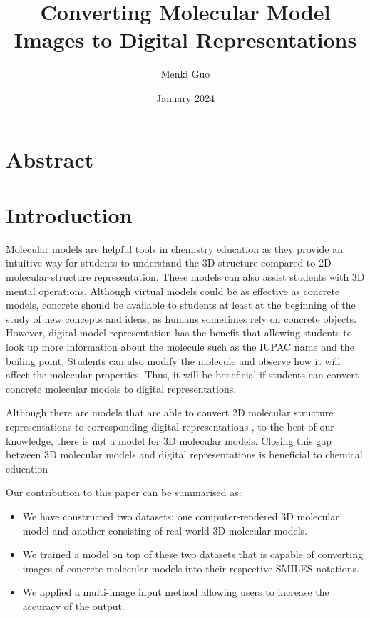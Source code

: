 \documentclass{article}
\title{Converting Molecular Model Images to Digital Representations}
\author{Menki Guo}
\date{January 2024}
\begin{document}
\maketitle
\section*{Abstract}
 
\section{Introduction}
Molecular models are helpful tools in chemistry education as they provide an intuitive way for students to understand the 3D structure compared to 2D molecular structure representation. These models can also assist students with 3D mental operations. Although virtual models could be as effective as concrete models, concrete should be available to students at least at the beginning of the study of new concepts and ideas, as humans sometimes rely on concrete objects.\cite{savec_evaluating_2005} However, digital model representation has the benefit that allowing students to look up more information about the molecule such as the IUPAC name and the boiling point. Students can also modify the molecule and observe how it will affect the molecular properties. Thus, it will be beneficial if students can convert concrete molecular models to digital representations. 

Although there are models that are able to convert 2D molecular structure representations to corresponding digital representations \cite{swinocsr}\cite{decimer}\cite{chempix}, to the best of our knowledge, there is not a model for 3D molecular models. Closing this gap between 3D molecular models and digital representations is beneficial to chemical education 

Our contribution to this paper can be summarised as:
\begin{itemize}
\item We have constructed two datasets: one computer-rendered 3D molecular model and another consisting of real-world 3D molecular models.
\item We trained a model on top of these two datasets that is capable of converting images of concrete molecular models into their respective SMILES notations. 
\item We applied a multi-image input method allowing users to increase the accuracy of the output.
\end{itemize}
\end{document}
